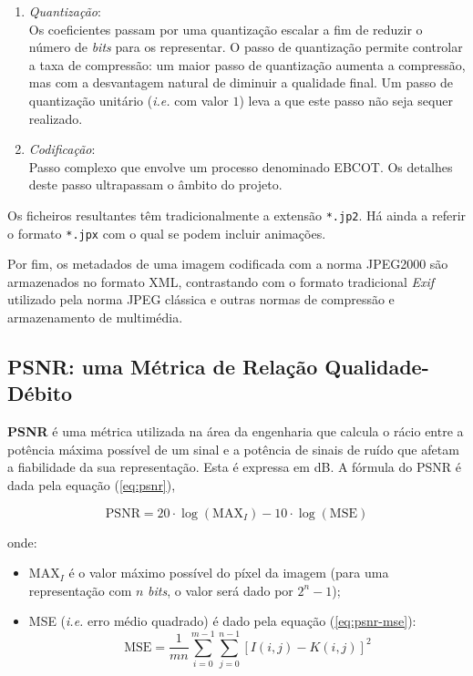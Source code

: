\begin{enumerate}
  \item \textit{Quantização}:\\ Os coeficientes passam por uma quantização escalar a fim de reduzir o número de \textit{bits} para os representar. O passo de quantização permite controlar a taxa de compressão: um maior passo de quantização aumenta a compressão, mas com a desvantagem natural de diminuir a qualidade final. Um passo de quantização unitário (\textit{i.e.} com valor $1$) leva a que este passo não seja sequer realizado.
  
  \item \textit{Codificação}:\\ Passo complexo que envolve um processo denominado \ac{EBCOT}. Os detalhes deste passo ultrapassam o âmbito do projeto.
\end{enumerate}

Os ficheiros resultantes têm tradicionalmente a extensão \verb|*.jp2|. Há ainda a referir o formato \verb|*.jpx| com o qual se podem incluir animações.

Por fim, os metadados de uma imagem codificada com a norma JPEG2000 são armazenados no formato \ac{XML}\cite{bib:jpeg2000}, contrastando com o formato tradicional \textit{Exif} utilizado pela norma \ac{JPEG} clássica e outras normas de compressão e armazenamento de multimédia.


\subsection{\acs{PSNR}: uma Métrica de Relação Qualidade-Débito}
\label{ssec::estado-arte:compress:psnr}

\textbf{\acf{PSNR}} é uma métrica utilizada na área da engenharia que calcula o rácio entre a potência máxima possível de um sinal e a potência de sinais de ruído que afetam a fiabilidade da sua representação. Esta é expressa em \acf{dB}. A fórmula do \ac{PSNR} é dada pela equação (\ref{eq:psnr})\cite{salomon2007data},

\begin{equation}
  \mathrm{PSNR} = 20\cdot\log\left(\mathrm{MAX}_I\right) - 10\cdot\log\left(\mathrm{MSE}\right)
  \label{eq:psnr}
\end{equation}

onde:
\begin{itemize}
  \item $\mathrm{MAX}_I$ é o valor máximo possível do píxel da imagem (para uma representação com $n$ \textit{bits}, o valor será dado por $2^n-1$);
  \item \ac{MSE} (\textit{i.e.} erro médio quadrado) é dado pela equação (\ref{eq:psnr-mse}):
    \begin{equation}
      \mathrm{MSE} = \frac{1}{mn}\sum_{i=0}^{m-1}\sum_{j=0}^{n-1}\left[I(i,j)-K(i,j)\right]^2
      \label{eq:psnr-mse}
    \end{equation}
\end{itemize}

